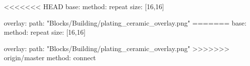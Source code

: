 <<<<<<< HEAD
base:
  method: repeat
  size: [16,16]

overlay:
  path: "Blocks/Building/plating_ceramic_overlay.png"
=======
base:
  method: repeat
  size: [16,16]

overlay:
  path: "Blocks/Building/plating_ceramic_overlay.png"
>>>>>>> origin/master
  method: connect